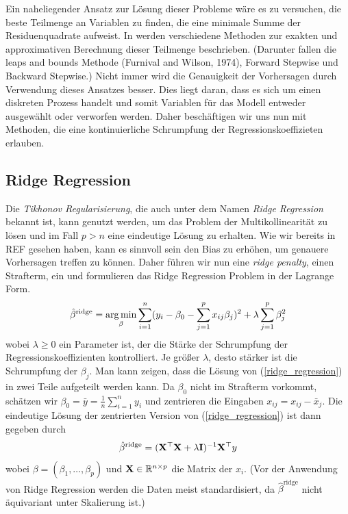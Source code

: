 Ein naheliegender Ansatz zur Lösung dieser Probleme wäre es zu versuchen, die beste Teilmenge an Variablen zu finden, die eine minimale Summe der Residuenquadrate aufweist. In \cite{hastie_elements} werden verschiedene Methoden zur exakten und approximativen Berechnung dieser Teilmenge beschrieben. (Darunter fallen die leaps and bounds Methode (Furnival and Wilson, 1974), Forward Stepwise und Backward Stepwise.) Nicht immer wird die Genauigkeit der Vorhersagen durch Verwendung dieses Ansatzes besser. Dies liegt daran, dass es sich um einen diskreten Prozess handelt und somit Variablen für das Modell entweder ausgewählt oder verworfen werden. Daher beschäftigen wir uns nun mit Methoden, die eine kontinuierliche Schrumpfung der Regressionskoeffizieten erlauben.\\

\subsection{Ridge Regression}

Die \textit{Tikhonov Regularisierung}, die auch unter dem Namen \textit{Ridge Regression} bekannt ist, kann genutzt werden, um das Problem der Multikollinearität zu lösen und im Fall $p > n$ eine eindeutige Lösung zu erhalten.
Wie wir bereits in REF gesehen haben, kann es sinnvoll sein den Bias zu erhöhen, um genauere Vorhersagen treffen zu können. Daher führen wir nun eine \textit{ridge penalty}, einen Strafterm, ein und formulieren das Ridge Regression Problem in der Lagrange Form.
\begin{align}
\label{ridge_regression}
\hat{\beta}^{\text{ridge}} = \operatorname*{arg\,min}_{\beta} \sum_{i=1}^{n}(y_i - \beta_0 - \sum_{j=1}^p x_{ij}\beta_j)^2 + \lambda\sum_{j=1}^p \beta_j^2
\end{align}
wobei $\lambda \geq 0$ ein Parameter ist, der die Stärke der Schrumpfung der Regressionskoeffizienten kontrolliert. Je größer $\lambda$, desto stärker ist die Schrumpfung der $\beta_j$. Man kann zeigen, dass die Lösung von (\ref{ridge_regression}) in zwei Teile aufgeteilt werden kann. Da $\beta_0$ nicht im Strafterm vorkommt, schätzen wir $\beta_0 = \bar{y} = \frac{1}{n}\sum_{i=1}^{n} y_i$ und zentrieren die Eingaben $x_{ij} = x_{ij} - \bar{x}_j$. Die eindeutige Lösung der zentrierten Version von (\ref{ridge_regression}) ist dann gegeben durch
\begin{align}
\hat{\beta}^{\text{ridge}}  = (\mathbf{X}^{\top} \mathbf{X} + \lambda\mathbf{I})^{-1}\mathbf{X}^{\top}y
\end{align}
wobei $\beta = (\beta_1, \ldots, \beta_p)$ und $\mathbf{X} \in \mathbb{R}^{n \times p}$ die Matrix der $x_i$. (Vor der Anwendung von Ridge Regression werden die Daten meist standardisiert, da $\hat{\beta}^{\text{ridge}}$ nicht äquivariant unter Skalierung ist.) \\


